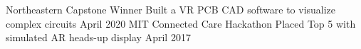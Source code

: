 
\begin{cvhonors}

  \cvhonor
    {Northeastern Capstone Winner} %
    {Built a VR PCB CAD software to visualize complex circuits} %
    {April 2020} %
  \cvhonor
    {MIT Connected Care Hackathon} %
    {Placed Top 5 with simulated AR heads-up display} %
    {April 2017} %
    
%
\end{cvhonors}
